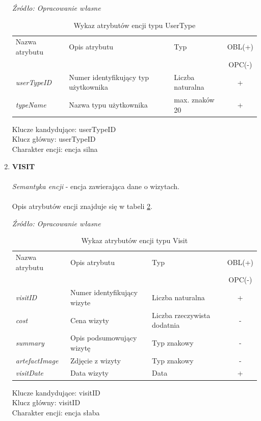 \documentclass[12pt,oneside]{report}
\begin{document}
\begin{enumerate}[start=10,label={\bfseries ENC$\backslash$\arabic*}]
\begin{table}[H]
	\caption{Wykaz atrybutów encji typu UserType }
	\textit{Źródło: Opracowanie własne}
	\label{UserTypeAtribute}
	\centering
	\begin{tabular}{|l|l|l|c|}			
		\hline
		Nazwa atrybutu & Opis atrybutu & Typ & OBL(+) \\
		& & &  OPC(-) \\
		\hline
		\textit{userTypeID} & Numer identyfikujący typ użytkownika & Liczba naturalna & + \\
		\hline
		\textit{typeName} & Nazwa typu użytkownika & max. znaków 20 & + \\
		\hline
	\end{tabular}
\end{table}
Klucze kandydujące: userTypeID \\
Klucz główny: userTypeID \\
Charakter encji: encja silna \\

\item \textbf{VISIT}\\ \\
\textit{Semantyka encji} - encja zawierająca dane o wizytach. 			
\\ \\
Opis atrybutów encji znajduje się w tabeli \ref{VisitAtribute}.

\begin{table}[H]
	\caption{Wykaz atrybutów encji typu Visit }
	\textit{Źródło: Opracowanie własne}
	\label{VisitAtribute}
	\centering
	\begin{tabular}{|l|l|l|c|}
		\hline
		Nazwa atrybutu & Opis atrybutu & Typ & OBL(+) \\
		& & &  OPC(-) \\
		\hline
		\textit{visitID} & Numer identyfikujący wizyte & Liczba naturalna & + \\
		\hline
		\textit{cost} & Cena wizyty & Liczba rzeczywista dodatnia & - \\
		\hline
		\textit{summary} & Opis podsumowujący wizytę & Typ znakowy & - \\
		\hline
		\textit{artefactImage} & Zdjęcie z wizyty & Typ znakowy & - \\
		\hline
		\textit{visitDate} & Data wizyty & Data & + \\
		\hline
	\end{tabular}
\end{table}
Klucze kandydujące: visitID \\
Klucz główny: visitID \\
Charakter encji: encja słaba \\


\end{enumerate}
\end{document}
